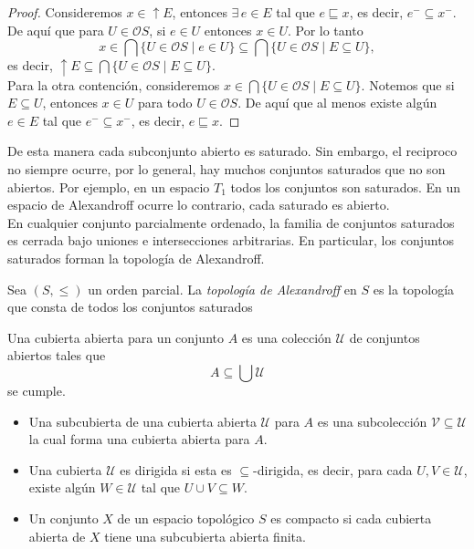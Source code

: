 \begin{proof}
    Consideremos $x\in \uparrow{E}$, entonces $\exists\, e\in E$ tal que $e \sqsubseteq x$, es decir, $e^-\subseteq x^-$. De aquí que para $U\in\mathcal{O}S$, si $e\in U$ entonces $x\in U$. Por lo tanto
    \[
    x\in \bigcap \{U\in \mathcal{O}S\mid e\in U\}\subseteq \bigcap \{U\in \mathcal{O}S\mid E\subseteq U\},
    \]
    es decir, $\uparrow E\subseteq \bigcap \{U\in \mathcal{O}S\mid E\subseteq U\}$.\\

    Para la otra contención, consideremos $x\in \bigcap\{U\in \mathcal{O}S\mid E\subseteq U\}$. Notemos que si $E\subseteq U$, entonces $x\in U$ para todo $U\in \mathcal{O}S$. De aquí que al menos existe algún $e\in E$ tal que $e^-\subseteq x^-$, es decir, $e\sqsubseteq x$. 
\end{proof}

De esta manera cada subconjunto abierto es saturado. Sin embargo, el reciproco no siempre ocurre, por lo general, hay muchos conjuntos saturados que no son abiertos. Por ejemplo, en un espacio $T_1$ todos los conjuntos son saturados. En un espacio de Alexandroff ocurre lo contrario, cada saturado es abierto.\\

En cualquier conjunto parcialmente ordenado, la familia de conjuntos saturados es cerrada bajo uniones e intersecciones arbitrarias. En particular, los conjuntos saturados forman la topología de Alexandroff.

\begin{dfn}\label{Alexandroff}
    Sea $(S, \leq)$ un orden parcial. La \emph{topología de Alexandroff} en $S$ es la topología que consta de todos los conjuntos saturados
\end{dfn}

\begin{dfn}
    Una cubierta abierta para un conjunto $A$ es una colección $\mathcal{U}$ de conjuntos abiertos tales que 
    \[
    A\subseteq \bigcup \mathcal{U}
    \]
    se cumple.

    \begin{itemize}
        \item Una subcubierta de una cubierta abierta $\mathcal{U}$ para $A$ es una subcolección $\mathcal{V}\subseteq \mathcal{U}$ la cual forma una cubierta abierta para $A$.
        \item Una cubierta $\mathcal{U}$ es dirigida si esta es $\subseteq$-dirigida, es decir, para cada $U,V\in \mathcal{U}$, existe algún $W\in \mathcal{U}$ tal que $U\cup V\subseteq W$.
        \item Un conjunto $X$ de un espacio topológico $S$ es compacto si cada cubierta abierta de $X$ tiene una subcubierta abierta finita.
    \end{itemize}
\end{dfn}

